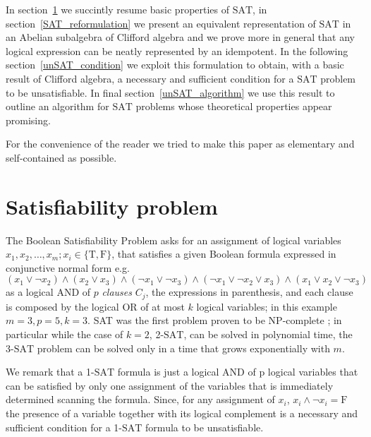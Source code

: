 \documentclass[a4paper,twoside,11pt]{article}
\begin{document}
In section~\ref{SAT_basics} we succintly resume basic properties of {\ensuremath{\mbox{SAT}}}, in section~\ref{SAT_reformulation} we present an equivalent representation of {\ensuremath{\mbox{SAT}}}{} in an Abelian subalgebra of Clifford algebra and we prove more in general that any logical expression can be neatly represented by an idempotent. In the following section~\ref{unSAT_condition} we exploit this formulation to obtain, with a basic result of Clifford algebra, a necessary and sufficient condition for a {\ensuremath{\mbox{SAT}}}{} problem to be unsatisfiable. In final section~\ref{unSAT_algorithm} we use this result to outline an algorithm for {\ensuremath{\mbox{SAT}}}{} problems whose theoretical properties appear promising.

For the convenience of the reader we tried to make this paper as elementary and self-contained as possible.

\section{Satisfiability problem}
\label{SAT_basics}
The Boolean Satisfiability Problem \cite[Section~7.2.2.2]{Knuth_2015} asks for an assignment of logical variables $x_1, x_2, \ldots ,x_m; x_i \in \{\mathrm{T}, \mathrm{F}\}$, that satisfies a given Boolean formula expressed in conjunctive normal form {e.g.\ }
$$
(x_1 \lor \lnot x_2) \land (x_2 \lor x_3) \land ( \lnot x_1 \lor \lnot x_3) \land ( \lnot x_1 \lor \lnot x_2 \lor x_3) \land (x_1 \lor x_2 \lor \lnot x_3)
$$
as a logical AND of $p$ \emph{clauses} $C_j$, the expressions in parenthesis, and each clause is composed by the logical OR of at most $k$ logical variables; in this example $m = 3, p = 5, k = 3$. SAT was the first problem proven to be NP-complete \cite{Cook_1971}; in particular while the case of $k = 2$, 2-{\ensuremath{\mbox{SAT}}}, can be solved in polynomial time, the 3-{\ensuremath{\mbox{SAT}}}{} problem can be solved only in a time that grows exponentially with $m$.

We remark that a 1-{\ensuremath{\mbox{SAT}}}{} formula is just a logical AND of p logical variables that can be satisfied by only one assignment of the variables that is immediately determined scanning the formula. Since, for any assignment of $x_i$, $x_i \land \lnot {x}_i = \mathrm{F}$ the presence of a variable together with its logical complement is a necessary and sufficient condition for a 1-{\ensuremath{\mbox{SAT}}}{} formula to be unsatisfiable.
\end{document}
